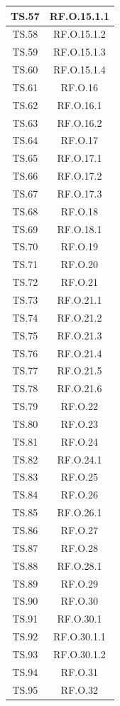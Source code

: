 \begin{xltabular}{\textwidth}{|c|c|}
\hline
TS.57 & RF.O.15.1.1 \\
\hline
TS.58 & RF.O.15.1.2 \\
\hline
TS.59 & RF.O.15.1.3 \\
\hline
TS.60 & RF.O.15.1.4 \\
\hline
TS.61 & RF.O.16 \\
\hline
TS.62 & RF.O.16.1 \\
\hline
TS.63 & RF.O.16.2 \\
\hline
TS.64 & RF.O.17 \\
\hline
TS.65 & RF.O.17.1 \\
\hline
TS.66 & RF.O.17.2 \\
\hline
TS.67 & RF.O.17.3 \\
\hline
TS.68 & RF.O.18 \\
\hline
TS.69 & RF.O.18.1 \\
\hline
TS.70 & RF.O.19 \\
\hline
TS.71 & RF.O.20 \\
\hline
TS.72 & RF.O.21 \\
\hline
TS.73 & RF.O.21.1 \\
\hline
TS.74 & RF.O.21.2 \\
\hline
TS.75 & RF.O.21.3 \\
\hline
TS.76 & RF.O.21.4 \\
\hline
TS.77 & RF.O.21.5 \\
\hline
TS.78 & RF.O.21.6 \\
\hline
TS.79 & RF.O.22 \\
\hline
TS.80 & RF.O.23 \\
\hline
TS.81 & RF.O.24 \\
\hline
TS.82 & RF.O.24.1 \\
\hline
TS.83 & RF.O.25 \\
\hline
TS.84 & RF.O.26 \\
\hline
TS.85 & RF.O.26.1 \\
\hline
TS.86 & RF.O.27 \\
\hline
TS.87 & RF.O.28 \\
\hline
TS.88 & RF.O.28.1 \\
\hline
TS.89 & RF.O.29 \\
\hline
TS.90 & RF.O.30 \\
\hline
TS.91 & RF.O.30.1 \\
\hline
TS.92 & RF.O.30.1.1 \\
\hline
TS.93 & RF.O.30.1.2 \\
\hline
TS.94 & RF.O.31 \\
\hline
TS.95 & RF.O.32 \\

\end{xltabular}
